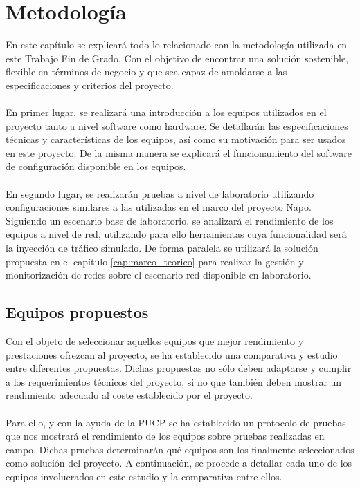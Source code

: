 \chapter{Metodología}
\label{cap:metodologia}
En este capítulo se explicará todo lo relacionado con la metodología utilizada en este Trabajo Fin de Grado. Con el objetivo de encontrar una solución sostenible, flexible en términos de negocio y que sea capaz de amoldarse a las especificaciones y criterios del proyecto.\\\\

En primer lugar, se realizará una introducción a los equipos utilizados en el proyecto tanto a nivel software como hardware. Se detallarán las especificaciones técnicas y características de los equipos, así como su motivación para ser usados en este proyecto. De la misma manera se explicará el funcionamiento del software de configuración disponible en los equipos.\\\\

En segundo lugar, se realizarán pruebas a nivel de laboratorio utilizando configuraciones similares a las utilizadas en el marco del proyecto Napo. Siguiendo un escenario base de laboratorio, se analizará el rendimiento de los equipos a nivel de red, utilizando para ello herramientas cuya funcionalidad será la inyección de tráfico simulado. De forma paralela se utilizará la solución propuesta en el capítulo \ref{cap:marco_teorico} para realizar la gestión y monitorización de redes sobre el escenario red disponible en laboratorio.

\section{Equipos propuestos}
Con el objeto de seleccionar aquellos equipos que mejor rendimiento y prestaciones ofrezcan al proyecto, se ha establecido una comparativa y estudio entre diferentes propuestas. Dichas propuestas no sólo deben adaptarse y cumplir a los requerimientos técnicos del proyecto, si no que también deben mostrar un rendimiento adecuado al coste establecido por el proyecto.\\\\

Para ello, y con la ayuda de la PUCP se ha establecido un protocolo de pruebas que nos mostrará el rendimiento de los equipos sobre pruebas realizadas en campo. Dichas pruebas determinarán qué equipos son los finalmente seleccionados como solución del proyecto. A continuación, se procede a detallar cada uno de los equipos involucrados en este estudio y la comparativa entre ellos.

